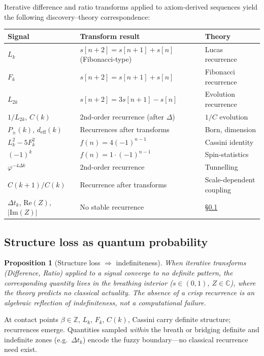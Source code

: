 \documentclass[12pt,a4paper]{article}
\newtheorem{proposition}[theorem]{Proposition}
\begin{document}
Iterative difference and ratio transforms applied to axiom-derived sequences yield the following discovery–theory correspondence:

\begin{center}
\begin{tabular}{@{}lll@{}}
\toprule
\textbf{Signal} & \textbf{Transform result} & \textbf{Theory} \\
\midrule
$L_k$ & $s[n+2]=s[n+1]+s[n]$ (Fibonacci-type) & Lucas recurrence \\
$F_k$ & $s[n+2]=s[n+1]+s[n]$ & Fibonacci recurrence \\
$L_{2k}$ & $s[n+2]=3s[n+1]-s[n]$ & Evolution recurrence \\
$1/L_{2k}$, $C(k)$ & 2nd-order recurrence (after $\Delta$) & $1/C$ evolution \\
$P_\pm(k)$, $d_{\mathrm{eff}}(k)$ & Recurrences after transforms & Born, dimension \\
$L_k^2-5F_k^2$ & $f(n)=4(-1)^{n-1}$ & Cassini identity \\
$(-1)^k$ & $f(n)=1\cdot(-1)^{n-1}$ & Spin-statistics \\
$\varphi^{-4\Delta k}$ & 2nd-order recurrence & Tunnelling \\
$C(k+1)/C(k)$ & Recurrence after transforms & Scale-dependent coupling \\
$\Delta t_k$, $\mathrm{Re}(Z)$, $|\mathrm{Im}(Z)|$ & No stable recurrence & \S\ref{subsec:structure-loss} \\
\bottomrule
\end{tabular}
\end{center}

\subsection{Structure loss as quantum probability}
\label{subsec:structure-loss}

\begin{proposition}[Structure loss $\Rightarrow$ indefiniteness]
\label{prop:structure-loss}
When iterative transforms (Difference, Ratio) applied to a signal converge to no definite pattern, the corresponding quantity lives in the breathing interior ($s \in (0,1)$, $Z \in \mathbb{C}$), where the theory predicts \emph{no classical actuality}. The absence of a crisp recurrence is an algebraic reflection of indefiniteness, not a computational failure.
\end{proposition}

\noindent At contact points $\beta \in \mathbb{Z}$, $L_k$, $F_k$, $C(k)$, Cassini carry definite structure; recurrences emerge. Quantities sampled \emph{within} the breath or bridging definite and indefinite zones (e.g.\ $\Delta t_k$) encode the fuzzy boundary---no classical recurrence need exist.
\end{document}
